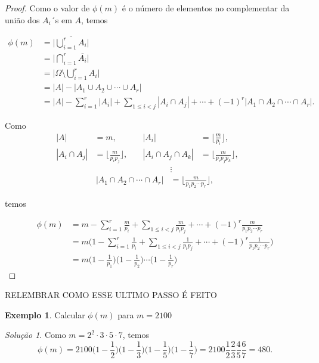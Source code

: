 \documentclass[]{book}
\theoremstyle{definition}
\theoremstyle{definition}
\newtheorem{example}{Exemplo}[chapter]
\theoremstyle{definition}
\theoremstyle{remark}
\newtheorem*{solution}{Solução}
\begin{document}
\begin{proof}
\iffalse{} {Prova. } \fi{}Como o valor de \(\phi(m)\) é o número de elementos no complementar da união dos \(A_i\)´s em \(A\), temos

\begin{align}
\phi (m) &= \Big| \overline{\bigcup_{i=1}^{r} A_i} \Big| \\
         &= \Big| \bigcap_{i=1}^{r} \overline{A_i} \Big| \\
         &= \Big| \Omega \setminus \bigcup_{i=1}^{r} A_i \Big| \\
         &= |A| - |A_1 \cup A_2 \cup \cdots \cup A_r| \\
         &= |A| - \sum_{i=1}^{r}|A_i| + \sum_{1\leq i<j}|A_i \cap A_j| + \cdots + (-1)^r|A_1\cap A_2\cap\cdots\cap A_r|.
\end{align}

Como
\begin{align} 
|A| &= m, &\quad |A_i| &= \bigg\lfloor{\frac{m}{p_i}}\bigg\rfloor, &\quad \\
|A_i \cap A_j| &= \bigg\lfloor{\frac{m}{p_i p_j}}\bigg\rfloor, &\quad 
|A_i \cap A_j \cap A_k| &= \bigg\lfloor{\frac{m}{p_i p_j p_k}}\bigg\rfloor,
\end{align}
\begin{align} 
&\vdots \\ |A_1 \cap A_2 \cap\cdots\cap A_r| &= \bigg\lfloor{\frac{m}{p_1 p_2 \cdots p_r}}\bigg\rfloor,
\end{align}

temos

\begin{align}
\phi(m) &= m - \sum_{i=1}^{r}\frac{m}{p_i} + \sum_{1\leq i<j}\frac{m}{p_i p_j} + \cdots + (-1)^r\frac{m}{p_1 p_2 \cdots p_r}\\
&= m \Big(1 - \sum_{i=1}^{r}\frac{1}{p_i} + \sum_{1\leq i<j}\frac{1}{p_i p_j} + \cdots + (-1)^r\frac{1}{p_1 p_2 \cdots p_r} \Big) \\
&= m \Big(1 - \frac{1}{p_1}\Big)\Big(1 - \frac{1}{p_2}\Big)\cdots\Big(1 - \frac{1}{p_r}\Big)
\end{align}
\end{proof}
{RELEMBRAR COMO ESSE ULTIMO PASSO É FEITO}

\begin{example}
\protect\hypertarget{exm:unnamed-chunk-76}{}{\label{exm:unnamed-chunk-76} }Calcular \(\phi(m)\) para \(m=2100\)
\end{example}

\begin{solution}
\iffalse{} {Solução. } \fi{}Como \(m=2^2\cdot 3\cdot 5\cdot 7\), temos
\[\phi(m) = 2100 \Big(1 - \frac{1}{2}\Big)\Big(1 - \frac{1}{3}\Big) \Big(1 - \frac{1}{5}\Big)\Big(1 - \frac{1}{7}\Big) = 2100 \frac{1}{2}\frac{2}{3}\frac{4}{5}\frac{6}{7} = 480.\]
\end{solution}
\end{document}
